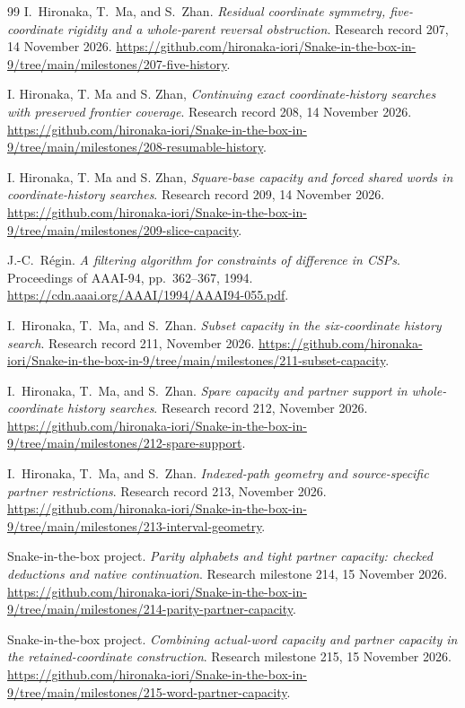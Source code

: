 \documentclass[11pt,a4paper]{article}
\theoremstyle{definition}
\theoremstyle{remark}
\begin{document}
\begin{thebibliography}{99}
I.~Hironaka, T.~Ma, and S.~Zhan. \emph{Residual coordinate symmetry,
five-coordinate rigidity and a whole-parent reversal obstruction}.
Research record 207, 14 November 2026.
\url{https://github.com/hironaka-iori/Snake-in-the-box-in-9/tree/main/milestones/207-five-history}.

I. Hironaka, T. Ma and S. Zhan, \emph{Continuing exact coordinate-history
searches with preserved frontier coverage}. Research record 208,
14 November 2026.
\url{https://github.com/hironaka-iori/Snake-in-the-box-in-9/tree/main/milestones/208-resumable-history}.

I. Hironaka, T. Ma and S. Zhan, \emph{Square-base capacity and forced
shared words in coordinate-history searches}. Research record 209,
14 November 2026.
\url{https://github.com/hironaka-iori/Snake-in-the-box-in-9/tree/main/milestones/209-slice-capacity}.

J.-C.~R\'egin. \emph{A filtering algorithm for constraints of difference
in CSPs}. Proceedings of AAAI-94, pp.~362--367, 1994.
\url{https://cdn.aaai.org/AAAI/1994/AAAI94-055.pdf}.

I.~Hironaka, T.~Ma, and S.~Zhan. \emph{Subset capacity in the
six-coordinate history search}. Research record 211, November 2026.
\url{https://github.com/hironaka-iori/Snake-in-the-box-in-9/tree/main/milestones/211-subset-capacity}.

I.~Hironaka, T.~Ma, and S.~Zhan. \emph{Spare capacity and partner support
in whole-coordinate history searches}. Research record 212, November 2026.
\url{https://github.com/hironaka-iori/Snake-in-the-box-in-9/tree/main/milestones/212-spare-support}.

I.~Hironaka, T.~Ma, and S.~Zhan. \emph{Indexed-path geometry and
source-specific partner restrictions}. Research record 213, November 2026.
\url{https://github.com/hironaka-iori/Snake-in-the-box-in-9/tree/main/milestones/213-interval-geometry}.


Snake-in-the-box project. \emph{Parity alphabets and tight partner
capacity: checked deductions and native continuation}. Research
milestone 214, 15 November 2026.
\url{https://github.com/hironaka-iori/Snake-in-the-box-in-9/tree/main/milestones/214-parity-partner-capacity}.


Snake-in-the-box project. \emph{Combining actual-word capacity and partner
capacity in the retained-coordinate construction}. Research milestone
215, 15 November 2026.
\url{https://github.com/hironaka-iori/Snake-in-the-box-in-9/tree/main/milestones/215-word-partner-capacity}.

\end{thebibliography}
\end{document}
